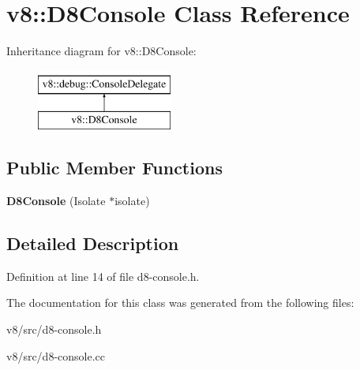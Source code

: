 \hypertarget{classv8_1_1D8Console}{}\section{v8\+:\+:D8\+Console Class Reference}
\label{classv8_1_1D8Console}
Inheritance diagram for v8\+:\+:D8\+Console\+:\begin{figure}[H]
\begin{center}
\leavevmode
\includegraphics[height=2.000000cm]{classv8_1_1D8Console}
\end{center}
\end{figure}
\subsection*{Public Member Functions}
\begin{DoxyCompactItemize}
\item 
\mbox{\label{classv8_1_1D8Console_a04bffbc1b2dd0650645a2292f5d5b61a}} 
{\bfseries D8\+Console} (Isolate $\ast$isolate)
\end{DoxyCompactItemize}


\subsection{Detailed Description}


Definition at line 14 of file d8-\/console.\+h.



The documentation for this class was generated from the following files\+:\begin{DoxyCompactItemize}
\item 
v8/src/d8-\/console.\+h\item 
v8/src/d8-\/console.\+cc\end{DoxyCompactItemize}
